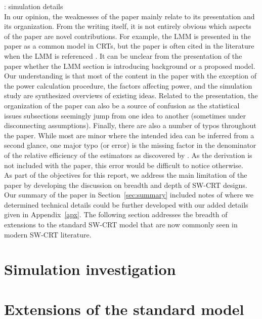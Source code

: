 \documentclass[10pt]{article}
\begin{document}
\todo: simulation details
\\

In our opinion, the weaknesses of the paper mainly relate to its presentation and its organization. From the writing itself, it is not entirely obvious which aspects of the paper are novel contributions. For example, the LMM is presented in the paper as a common model in CRTs, but the paper is often cited in the literature when the LMM is referenced \parencite[e.g.,][]{Harrison:2020,Bowden:2021,DavisPlourde:2021}. It can be unclear from the presentation of the paper whether the LMM section is introducing background or a proposed model. Our understanding is that most of the content in the paper with the exception of the power calculation procedure, the factors affecting power, and the simulation study are synthesized overviews of existing ideas. Related to the presentation, the organization of the paper can also be a source of confusion as the statistical issues subsections seemingly jump from one idea to another (sometimes under disconnecting assumptions). Finally, there are also a number of typos throughout the paper. While most are minor where the intended idea can be inferred from a second glance, one major typo (or error) is the missing factor in the denominator of the relative efficiency of the estimators as discovered by \textcite{Liao:2015}. As the derivation is not included with the paper, this error would be difficult to notice otherwise.
\\

As part of the objectives for this report, we address the main limitation of the paper by developing the discussion on breadth and depth of SW-CRT designs. Our summary of the paper in Section~\ref{sec:summary} included notes of where we determined technical details could be further developed with our added details given in Appendix~\ref{apx}. The following section addresses the breadth of extensions to the standard SW-CRT model that are now commonly seen in modern SW-CRT literature.


\section{Simulation investigation} \label{sec:simulation}


\section{Extensions of the standard model} \label{sec:extension}
\end{document}
